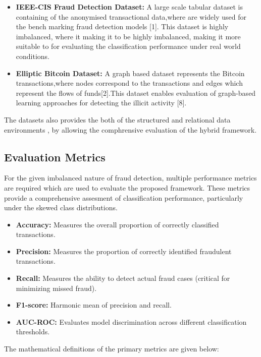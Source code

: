 \documentclass[conference]{IEEEtran}
\begin{document}
\begin{itemize}
    \item \textbf{IEEE-CIS Fraud Detection Dataset:}  
    A large scale tabular dataset is containing of the anonymised transactional data,where are widely used for the bench marking fraud detection models [1]. This dataset is highly imbalanced, where it making it to be highly imbalanced, making it more suitable to for evaluating the classification performance under real world conditions.

    \item \textbf{Elliptic Bitcoin Dataset:}  
    A graph based dataset represents the Bitcoin transactions,where nodes correspond to the transactions and edges which represent the flows of funds[2].This dataset enables evaluation of graph-based learning approaches for detecting the illicit activity [8].
    
\end{itemize}
The datasets also provides the both of the structured and relational data environments , by allowing the comphrensive evaluation of the hybrid framework.


\subsection{Evaluation Metrics}

For the given imbalanced nature of fraud detection, multiple performance metrics are required which are used to evaluate the proposed framework. These metrics provide a comprehensive assesment of classification performance, particularly under the skewed class distributions.


\begin{itemize}
    \item \textbf{Accuracy:} Measures the overall proportion of correctly classified transactions.
    \item \textbf{Precision:} Measures the proportion of correctly identified fraudulent transactions.
    \item \textbf{Recall:} Measures the ability to detect actual fraud cases (critical for minimizing missed fraud).
    \item \textbf{F1-score:} Harmonic mean of precision and recall.
    \item \textbf{AUC-ROC:} Evaluates model discrimination across different classification thresholds.
\end{itemize}

The mathematical definitions of the primary metrics are given below:
\end{document}
